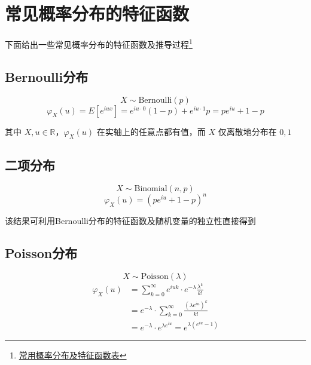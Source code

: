 \documentclass[a4paper, 11pt]{article} %
\begin{document}
\section{常见概率分布的特征函数}

下面给出一些常见概率分布的特征函数及推导过程\footnote{\href{https://wenku.baidu.com/view/3d902b0e27284b73f3425029.html}{常用概率分布及特征函数表}}

\subsection{Bernoulli分布}

\begin{equation*}
X\sim\text{Bernoulli}(p)
\end{equation*}
\begin{equation*}
\varphi_X(u)=E[e^{iux}]=e^{iu\cdot 0}(1-p)+e^{iu\cdot 1}p=pe^{iu}+1-p
\end{equation*}

其中 $X,u\in\mathbb{R}$，$\varphi_X(u)$ 在实轴上的任意点都有值，而 $X$ 仅离散地分布在 $0,1$

\subsection{二项分布}

\begin{equation*}
X\sim\text{Binomial}(n,p)
\end{equation*}
\begin{equation*}
\varphi_X(u)=(pe^{iu}+1-p)^n
\end{equation*}

该结果可利用Bernoulli分布的特征函数及随机变量的独立性直接得到

\subsection{Poisson分布}

\begin{equation*}
X\sim\text{Poisson}(\lambda)
\end{equation*}
\begin{align*}
	\varphi_X(u) &= \sum\limits_{k=0}^{\infty} e^{iuk}\cdot e^{-\lambda}\frac{\lambda^k}{k!} \\
	&= e^{-\lambda}\cdot\sum\limits_{k=0}^{\infty}\frac{(\lambda e^{iu})^k}{k!} \\
	&= e^{-\lambda}\cdot e^{\lambda e^{iu}} =e^{\lambda(e^{iu}-1)}
\end{align*}
\end{document}

